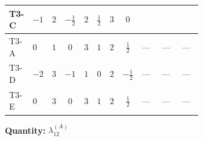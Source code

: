 \documentclass[8pt]{article}
\begin{document}
\begin{landscape}
\begin{longtable}{@{}llcccccc >{\raggedright\arraybackslash}p{0.21\linewidth} >{\raggedright\arraybackslash}p{0.21\linewidth} >{\raggedright\arraybackslash}p{0.21\linewidth}@{}}
T3-C & $-1$ & $2$ & $-\frac{1}{2}$ & $2$ & $\frac{1}{2}$ & $3$ & $0$ & \scriptsize\adjustbox{max width=\linewidth}{$\begin{gathered} +{\lambda_{11}} \left(\operatorname{Tr}\!\left({y_1}\,\left({y_2}\right)^{\dagger}\right)+\frac{4}{3} (\left({\lambda_{10}}\right)^{*}+5 \left({\lambda_{11}}\right)^{*})\right)\end{gathered}$} & \scriptsize\adjustbox{max width=\linewidth}{$\begin{gathered} +(\left({\lambda_{10}}\right)^{*}+\left({\lambda_{11}}\right)^{*}) \operatorname{Tr}\!\left({y_2}\,\left({y_1}\right)^{\dagger}\right)\end{gathered}$} & \scriptsize\adjustbox{max width=\linewidth}{$\begin{gathered} -\frac{8}{3} \operatorname{Tr}\!\left({y_1}\,\left({y_2}\right)^{\dagger}\,{y_2}\,\left({y_1}\right)^{\dagger}\right)\end{gathered}$} \\
\midrule
T3-A & $0$ & $1$ & $0$ & $3$ & $1$ & $2$ & $\frac{1}{2}$ & --- & --- & --- \\
\midrule
T3-D & $-2$ & $3$ & $-1$ & $1$ & $0$ & $2$ & $-\frac{1}{2}$ & --- & --- & --- \\
\midrule
T3-E & $0$ & $3$ & $0$ & $3$ & $1$ & $2$ & $\frac{1}{2}$ & --- & --- & --- \\
\midrule
\bottomrule
\end{longtable}
\clearpage
\noindent\textbf{Quantity: }$\lambda_{12}^{(A)}$\par\smallskip

\end{landscape}
\end{document}
